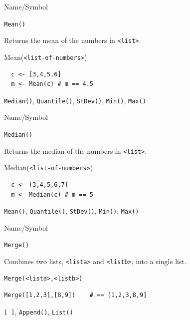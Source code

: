 \begin{desc}{Name/Symbol}
\item[Name/Symbol]	\verb+Mean()+

\item[Description] 	Returns the mean of the numbers in \verb+<list>+.

\item[Usage]	Mean(\verb+<list-of-numbers>+)	

\item[Example]	
\begin{verbatim} 
  c <- [3,4,5,6]
  m <- Mean(c) # m == 4.5
\end{verbatim}

\item[See Also]	\verb+Median()+, \verb+Quantile()+, \verb+StDev()+, \verb+Min()+, \verb+Max()+
\end{desc}


\begin{desc}{Name/Symbol}
\item[Name/Symbol]	\verb+Median()+

\item[Description]	Returns the median of the numbers in
  \verb+<list>+.  

\item[Usage]	Median(\verb+<list-of-numbers>+)

\item[Example]	
\begin{verbatim} 
  c <- [3,4,5,6,7]
  m <- Median(c) # m == 5
\end{verbatim}
\item[See Also]	\verb+Mean()+, \verb+Quantile()+, \verb+StDev()+, \verb+Min()+, \verb+Max()+
\end{desc}

\begin{desc}{Name/Symbol}
\item[Name/Symbol]	\verb+Merge()+

\item[Description]	Combines two lists, \verb+<lista>+ and \verb+<listb>+, into a single list.

\item[Usage]		
\begin{verbatim}
Merge(<lista>,<listb>)
\end{verbatim}

\item[Example]	
\begin{verbatim}
Merge([1,2,3],[8,9]) 	# == [1,2,3,8,9]
\end{verbatim}

\item[See Also]	\verb+[ ]+, \verb+Append()+, \verb+List()+
\end{desc}



